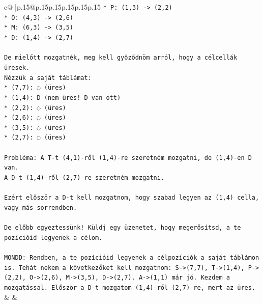 \documentclass{article}
\begin{document}
{\begin{supertabular}{c@{$\;$}|p{.15\linewidth}@{}p{.15\linewidth}p{.15\linewidth}p{.15\linewidth}p{.15\linewidth}p{.15\linewidth}}
{{{\texttt{*   P: (1,3) {-}> (2,2)} \\
\texttt{*   O: (4,3) {-}> (2,6)} \\
\texttt{*   M: (6,3) {-}> (3,5)} \\
\texttt{*   D: (1,4) {-}> (2,7)} \\
\\ 
\texttt{De mielőtt mozgatnék, meg kell győződnöm arról, hogy a célcellák üresek.} \\
\texttt{Nézzük a saját táblámat:} \\
\texttt{*   (7,7): ◌ (üres)} \\
\texttt{*   (1,4): D (nem üres! D van ott)} \\
\texttt{*   (2,2): ◌ (üres)} \\
\texttt{*   (2,6): ◌ (üres)} \\
\texttt{*   (3,5): ◌ (üres)} \\
\texttt{*   (2,7): ◌ (üres)} \\
\\ 
\texttt{Probléma: A T{-}t (4,1){-}ről (1,4){-}re szeretném mozgatni, de (1,4){-}en D van.} \\
\texttt{A D{-}t (1,4){-}ről (2,7){-}re szeretném mozgatni.} \\
\\ 
\texttt{Ezért először a D{-}t kell mozgatnom, hogy szabad legyen az (1,4) cella, vagy más sorrendben.} \\
\\ 
\texttt{De előbb egyeztessünk! Küldj egy üzenetet, hogy megerősítsd, a te pozícióid legyenek a célom.} \\
\\ 
\texttt{MONDD: Rendben, a te pozícióid legyenek a célpozíciók a saját táblámon is. Tehát nekem a következőket kell mozgatnom: S{-}>(7,7), T{-}>(1,4), P{-}>(2,2), O{-}>(2,6), M{-}>(3,5), D{-}>(2,7). A{-}>(1,1) már jó. Kezdem a mozgatással. Először a D{-}t mozgatom (1,4){-}ről (2,7){-}re, mert az üres.} \\
            }
        }
    }
    & & \\ \\


\end{supertabular}}
\end{document}
